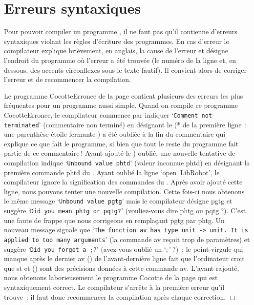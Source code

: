 \section{Erreurs syntaxiques} 

Pour pouvoir compiler un programme \ocaml, il ne faut pas qu'il contienne
d'erreurs syntaxiques violant les règles
d'écriture des programmes. En cas d'erreur le compilateur explique 
brièvement, en anglais, la cause de l'erreur et désigne l'endroit du programme
où l'er\-reur a été trouvée (le numéro de la ligne et, en dessous, des 
accents circonflexes {\idt {}} sous le texte fautif). Il convient alors de
corriger l'erreur et de recommencer la compilation.

\begin{exemple}{\rm
\hfill Le pro\-gram\-me {\idt CocotteErronee} de la page 
\pageref{prog:Cocotte-errone}
contient plusieurs des erreurs les plus fréquentes pour
un programme aussi simple.
Quand on compile ce programme {\idt CocotteErronee}, le compilateur commence par indiquer
`{\tt Comment not terminated}' (commentaire non terminé) en désignant le {\cmt (*} de la 
première ligne~: une parenthèse-étoile fermante {\cmt *)} a été oubliée à la fin du 
commentaire qui explique ce que fait le programme, si bien que tout le reste du 
programme fait partie de ce commentaire$\:$!
Ayant ajouté le {\cmt *)} oublié, une nouvelle tentative de compilation indique
`{\tt Unbound value phtd}' (valeur inconnue {\idt phtd}) en désignant la première 
commande {\idt phtd} du \robot. Ayant oublié la ligne `{\mcl open}\ {\idt LibRobot}', 
le compilateur ignore la signification des commandes du \robotErr. 
Après avoir ajouté cette ligne, nous pouvons tenter une nouvelle compilation.
Cette fois-ci nous obtenons le même message `{\tt Unbound value pgtg}' mais le 
compilateur désigne {\idt pgtg} et suggère `{\tt Did you mean phtg or pqtg?}' 
(vouliez-vous dire {\idt phtg} ou {\idt pqtg}$\:$?). C'est une faute de
frappe que nous corrigeons en remplaçant {\idt  pgtg} par {\idt  phtg}.
Un nouveau message signale que `{\tt The function av has type unit -> unit. 
It is applied to too many arguments}' (la commande {\idt av} reçoit trop de paramètres) 
et suggère `{\tt Did you forget a ;?}' (avez-vous oublié un `$;$'$\:$?)~: 
le point-virgule qui manque après le dernier {\idt av ()} de l'avant-dernière ligne fait 
que l'ordinateur croit que {\idt st} et {\idt ()} sont des précisions données à cette 
commande {\idt av}. L'ayant rajouté, nous
obtenons laborieusement le programme {\idt Cocotte} de la page 
\pageref{prog:Cocotte} qui est syntaxiquement correct.
Le compilateur s'arrête à la première erreur qu'il trouve~: il faut donc 
recommencer la compilation après chaque correction.
\noindent $\Box$ }\end{exemple}


